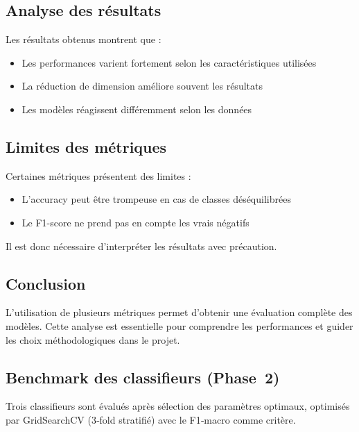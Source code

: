 \documentclass[12pt,a4paper]{article}
\begin{document}
    \subsection{Analyse des résultats}

    Les résultats obtenus montrent que :
    \begin{itemize}
        \item Les performances varient fortement selon les caractéristiques utilisées
        \item La réduction de dimension améliore souvent les résultats
        \item Les modèles réagissent différemment selon les données
    \end{itemize}

    \subsection{Limites des métriques}

    Certaines métriques présentent des limites :
    \begin{itemize}
        \item L’accuracy peut être trompeuse en cas de classes déséquilibrées
        \item Le F1-score ne prend pas en compte les vrais négatifs
    \end{itemize}

    Il est donc nécessaire d’interpréter les résultats avec précaution.

    \subsection{Conclusion}

    L’utilisation de plusieurs métriques permet d’obtenir une évaluation complète des modèles.
    Cette analyse est essentielle pour comprendre les performances et guider les choix méthodologiques dans le projet.

    \subsection{Benchmark des classifieurs (Phase~2)}
    Trois classifieurs sont évalués après sélection des paramètres optimaux, optimisés par GridSearchCV (3‑fold stratifié) avec le F1‑macro comme critère.
\end{document}
